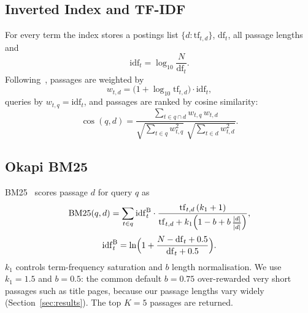 \documentclass[conference]{IEEEtran}
\begin{document}
\subsection{Inverted Index and TF-IDF}
For every term the index stores a postings list $\{d:\mathrm{tf}_{t,d}\}$, $\mathrm{df}_t$, all passage lengths and
\begin{equation}
\mathrm{idf}_t = \log_{10}\frac{N}{\mathrm{df}_t}. \label{eq:idf}
\end{equation}
Following~\cite{salton1988term,manning2008ir}, passages are weighted by
\begin{equation}
w_{t,d} = \bigl(1+\log_{10}\mathrm{tf}_{t,d}\bigr)\cdot\mathrm{idf}_t , \label{eq:wtd}
\end{equation}
queries by $w_{t,q}=\mathrm{idf}_t$, and passages are ranked by cosine similarity:
\begin{equation}
\cos(q,d)=\frac{\sum_{t\in q\cap d} w_{t,q}\,w_{t,d}}{\sqrt{\sum_{t\in q} w_{t,q}^2}\;\sqrt{\sum_{t\in d} w_{t,d}^2}} . \label{eq:cos}
\end{equation}

\subsection{Okapi BM25}
BM25~\cite{robertson2009bm25} scores passage $d$ for query $q$ as
\begin{equation}
\mathrm{BM25}(q,d)=\sum_{t\in q}\mathrm{idf}^{\mathrm{B}}_t\cdot\frac{\mathrm{tf}_{t,d}\,(k_1+1)}{\mathrm{tf}_{t,d}+k_1\Bigl(1-b+b\,\frac{|d|}{\overline{|d|}}\Bigr)} , \label{eq:bm25}
\end{equation}
\begin{equation}
\mathrm{idf}^{\mathrm{B}}_t=\ln\Bigl(1+\frac{N-\mathrm{df}_t+0.5}{\mathrm{df}_t+0.5}\Bigr). \label{eq:bm25idf}
\end{equation}
$k_1$ controls term-frequency saturation and $b$ length normalisation. We use $k_1=1.5$ and $b=0.5$: the common default $b=0.75$ over-rewarded very short passages such as title pages, because our passage lengths vary widely (Section~\ref{sec:results}). The top $K=5$ passages are returned.
\end{document}
